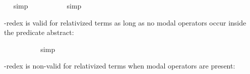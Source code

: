 \begin{isabellebody}
\isadelimproof
\ %
\endisadelimproof
%
\isatagproof
{}\isamarkupfalse%
\ simp%
\endisatagproof
{\isafoldproof}%
%
\isadelimproof
%
\endisadelimproof
\isanewline
{}\isamarkupfalse%
\ {\isachardoublequoteopen}{\isasymlfloor}{\isacharparenleft}{\isacharparenleft}{\isasymlambda}{\isasymalpha}{\isachardot}\ \isactrlbold {\isasymbox}{\isasymphi}\ {\isasymalpha}{\isacharparenright}\ {\isacharparenleft}{\isasymtau}{\isacharcolon}{\isacharcolon}{\isasymzero}{\isacharparenright}{\isacharparenright}\ \isactrlbold {\isasymleftrightarrow}\ {\isacharparenleft}\isactrlbold {\isasymbox}{\isasymphi}\ {\isasymtau}{\isacharparenright}{\isasymrfloor}{\isachardoublequoteclose}%
\isadelimproof
\ %
\endisadelimproof
%
\isatagproof
{}\isamarkupfalse%
\ simp%
\endisatagproof
{\isafoldproof}%
%
\isadelimproof
%
\endisadelimproof
%
\begin{isamarkuptext}%
\isa{{\isasymbeta}{\isasymeta}}-redex is valid for relativized terms as long as no modal operators occur inside the predicate abstract:%
\end{isamarkuptext}\isamarkuptrue%
\isamarkupfalse%
\ {\isachardoublequoteopen}{\isasymlfloor}{\isacharparenleft}{\isacharparenleft}{\isasymlambda}{\isasymalpha}{\isachardot}\ {\isasymphi}\ {\isasymalpha}{\isacharparenright}\ \isactrlbold {\isasymdownharpoonleft}{\isacharparenleft}{\isasymtau}{\isacharcolon}{\isacharcolon}{\isasymup}{\isasymzero}{\isacharparenright}{\isacharparenright}\ \isactrlbold {\isasymleftrightarrow}\ {\isacharparenleft}{\isasymphi}\ \isactrlbold {\isasymdownharpoonleft}{\isasymtau}{\isacharparenright}{\isasymrfloor}{\isachardoublequoteclose}%
\isadelimproof
\ %
\endisadelimproof
%
\isatagproof
{}\isamarkupfalse%
\ simp%
\endisatagproof
{\isafoldproof}%
%
\isadelimproof
%
\endisadelimproof
%
\begin{isamarkuptext}%
\isa{{\isasymbeta}{\isasymeta}}-redex is non-valid for relativized terms when modal operators are present:%
\end{isamarkuptext}\isamarkuptrue%
\isamarkupfalse%
\ {\isachardoublequoteopen}{\isasymlfloor}{\isacharparenleft}{\isacharparenleft}{\isasymlambda}{\isasymalpha}{\isachardot}\ \isactrlbold {\isasymbox}{\isasymphi}\ {\isasymalpha}{\isacharparenright}\ \isactrlbold {\isasymdownharpoonleft}{\isacharparenleft}{\isasymtau}{\isacharcolon}{\isacharcolon}{\isasymup}{\isasymzero}{\isacharparenright}{\isacharparenright}\ \isactrlbold {\isasymleftrightarrow}\ {\isacharparenleft}\isactrlbold {\isasymbox}{\isasymphi}\ \isactrlbold {\isasymdownharpoonleft}{\isasymtau}{\isacharparenright}{\isasymrfloor}{\isachardoublequoteclose}\ \isamarkupfalse%

\end{isabellebody}
